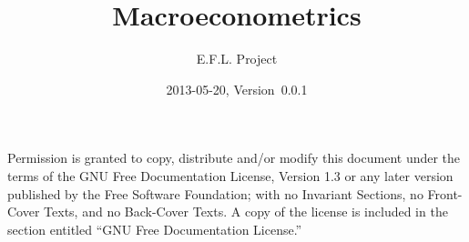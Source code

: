 \documentclass[nofonts,notitlepage]{tufte-latex/tufte-handout}
\title{Macroeconometrics}
\author{E.F.L. Project}
\date{2013-05-20, Version~0.0.1}
\begin{document}
\maketitle
\tableofcontents

  Permission is granted to
copy, distribute and/or modify this document under the terms of the
GNU Free Documentation License, Version 1.3 or any later version
published by the Free Software Foundation; with no Invariant Sections,
no Front-Cover Texts, and no Back-Cover Texts.  A copy of the license
is included in the section entitled ``GNU Free Documentation
License.''






\appendix

\end{document}
